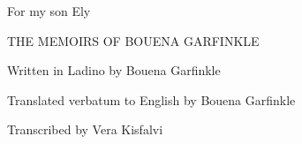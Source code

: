 \documentclass{article}
\begin{document}
\vspace{6ex}
\begin{center}
    For my son Ely
\end{center}

\newpage

\vspace{6ex}
\begin{center}
THE MEMOIRS OF BOUENA GARFINKLE 

Written in Ladino by Bouena Garfinkle 

Translated verbatum to English by Bouena Garfinkle 

Transcribed by Vera Kisfalvi 
\end{center}

\newpage

















\end{document}
